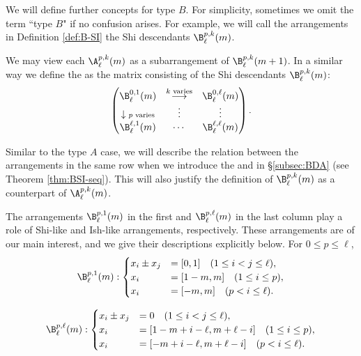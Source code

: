 We will  define further concepts for type $B$. 
For simplicity, sometimes we omit the term ``type $B$" if no confusion arises. 
For example, we will call the arrangements in Definition \ref{def:B-SI} the Shi  descendants $\B^{p,k}_\ell(m)$. 

We may view each $\A^{p,k}_\ell(m)$ as a subarrangement of  $\B^{p,k}_\ell(m+1)$.
In a similar way we define the   as the matrix consisting of the  Shi  descendants $\B^{p,k}_\ell(m)$:
$$
\begin{pmatrix}
    \B^{0,1}_\ell(m)& \overset{\text{\scriptsize{$k$ varies}}}{\longrightarrow} & \B^{0,\ell}_\ell(m)\\
\downarrow    \text{\scriptsize{$p$ varies}}  & \vdots  & \vdots  \\
\B^{\ell,1}_\ell(m) & \cdots & \B^{\ell,\ell}_\ell(m) 
          \end{pmatrix}.
       $$
      
  Similar to the type $A$ case, we will describe the relation between the arrangements in the same row when we introduce the   and  in \S\ref{subsec:BDA} (see Theorem \ref{thm:BSI-seq}). 
  This will also justify the definition of  $\B^{p,k}_\ell(m)$ as a counterpart of $\A^{p,k}_\ell(m)$.


The arrangements $\B^{p,1}_\ell(m)$ in the first and  $\B^{p,\ell}_\ell(m)$ in the last column play a role of Shi-like and Ish-like arrangements, respectively. 
These arrangements are of our main interest, and we give their descriptions explicitly below. 
For $0 \le p \le \ell$,
\begin{equation}
\label{eq:1stcol}
  \B^{p,1}_\ell(m): 
\begin{cases}
x_{i}\pm x_{j} &= [0 , 1]\quad  (1 \leq i < j \leq \ell), \\
x_i&=  [1-m , m] \quad (1 \leq   i \leq p), \\
x_i&=[-m , m]  \quad (p<  i \leq \ell).
\end{cases}
\end{equation}

\begin{equation}
\label{eq:lastcol}
  \B^{p,\ell}_\ell(m):
  \begin{cases}
x_{i}\pm x_{j} &= 0\quad  (1 \leq i < j \leq \ell), \\
x_i&=  [1-m+i-\ell , m+\ell-i] \quad (1 \leq   i \leq p), \\
x_i&=  [-m+i-\ell , m+\ell-i]   \quad (p<  i \leq \ell).
\end{cases}
\end{equation}


